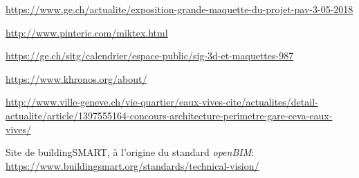 
\begin{thebibliography}{9}

 \url{https://www.ge.ch/actualite/exposition-grande-maquette-du-projet-pav-3-05-2018}

 \url{http://www.pinteric.com/miktex.html}

 \url{https://ge.ch/sitg/calendrier/espace-public/sig-3d-et-maquettes-987}

 \url{https://www.khronos.org/about/}


\url{http://www.ville-geneve.ch/vie-quartier/eaux-vives-cite/actualites/detail-actualite/article/1397555164-concours-architecture-perimetre-gare-ceva-eaux-vives/}

 Site de buildingSMART, à l'origine du standard \textit{openBIM}: \url{https://www.buildingsmart.org/standards/technical-vision/}

\end{thebibliography}
